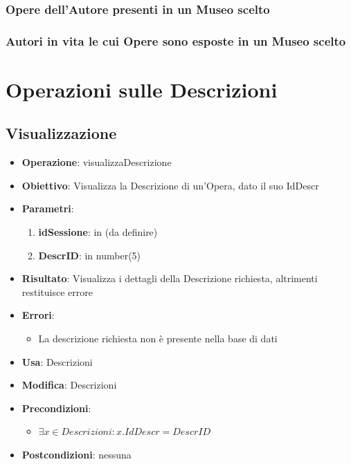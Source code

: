 \documentclass[a4paper,11pt]{article}
\begin{document}
\subsubsection{Opere dell’Autore presenti in un Museo scelto}
\subsubsection{Autori in vita le cui Opere sono esposte in un Museo scelto}

\section{Operazioni sulle Descrizioni}

\subsection{Visualizzazione}
\begin{itemize}
	\item \textbf{Operazione}: visualizzaDescrizione
	\item \textbf{Obiettivo}: Visualizza la Descrizione di un'Opera, dato il suo IdDescr
	\item \textbf{Parametri}:
	\begin{enumerate}
		\item \textbf{idSessione}: in (da definire)
		\item \textbf{DescrID}: in number(5)
	\end{enumerate}
	\item \textbf{Risultato}: Visualizza i dettagli della Descrizione richiesta, altrimenti restituisce errore
	\item \textbf{Errori}: 
	\begin{itemize}
		\item La descrizione richiesta non è presente nella base di dati
	\end{itemize}
	\item \textbf{Usa}: Descrizioni
	\item \textbf{Modifica}: Descrizioni
	\item \textbf{Precondizioni}:
	\begin{itemize}
		\item $\exists x \in Descrizioni : x.IdDescr = DescrID$
	\end{itemize}
	\item \textbf{Postcondizioni}: nessuna
\end{itemize}
\end{document}
